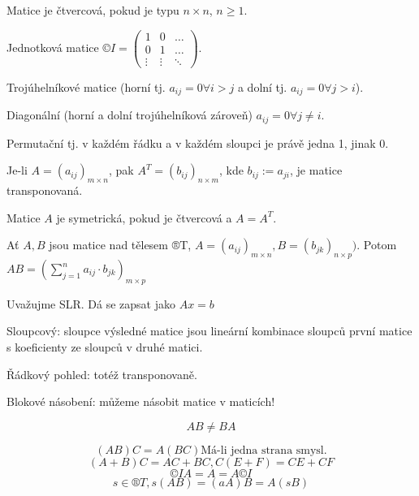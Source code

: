 \documentclass[12pt]{article}					%
\begin{document}
        \begin{definice}
            Matice je čtvercová, pokud je typu $n\times n$, $n≥1$.

            \begin{prikladyin}
                Jednotková matice $©I = \begin{pmatrix}1 & 0 & …\\0 & 1 & …\\ \vdots & \vdots & \ddots\end{pmatrix}$.

                Trojúhelníkové matice (horní tj. $a_{ij} = 0 \forall i>j$ a dolní tj. $a_{ij} = 0 \forall j>i$).

                Diagonální (horní a dolní trojúhelníková zároveň) $a_{ij} = 0 \forall j≠i$.

                Permutační tj. v každém řádku a v každém sloupci je právě jedna 1, jinak 0.
            \end{prikladyin}
        \end{definice}

        \begin{definice}
            Je-li $A = (a_{ij})_{m\times n}$, pak $A^T = (b_{ij})_{n\times m}$, kde $b_{ij} := a_{ji}$, je matice transponovaná.
        \end{definice}

        \begin{definice}
            Matice $A$ je symetrická, pokud je čtvercová a $A = A^T$.
        \end{definice}

        \begin{definice}
            Ať $A, B$ jsou matice nad tělesem ®T, $A=(a_{ij})_{m\times n}, B = (b_{jk})_{n\times p})$. Potom $AB = (\sum_{j=1}^n a_{ij} \cdot b_{jk})_{m\times p}$
        \end{definice}

        \begin{poznamka}
            Uvažujme SLR. Dá se zapsat jako $Ax = b$
        \end{poznamka}

        \begin{poznamka}
            Sloupcový: sloupce výsledné matice jsou lineární kombinace sloupců první matice s koeficienty ze sloupců v druhé matici.

            Řádkový pohled: totéž transponovaně.

            Blokové násobení: můžeme násobit matice v maticích!
        \end{poznamka}

        \begin{poznamka}
            \begin{upozorneni}
                $$ AB ≠ BA $$
            \end{upozorneni}
            $$ (AB)C = A(BC) \text{Má-li jedna strana smysl.} $$
            $$ (A+B)C = AC + BC, C(E+F) = CE + CF $$ 
            $$ ©IA = A = A©I $$ 
            $$ s\in ®T, s(AB) = (aA)B = A(sB) $$ 
        \end{poznamka}
\end{document}
